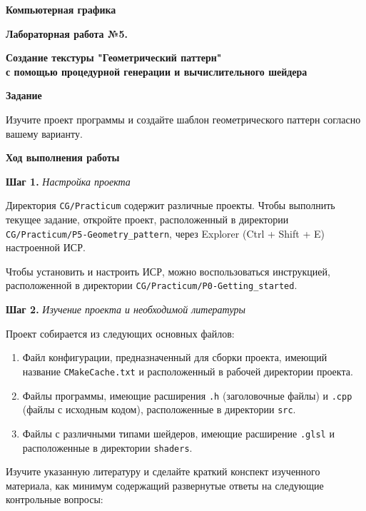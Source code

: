 \documentclass[a4paper,12pt]{article}
\begin{document}
\fontsize{14pt}{16pt}\selectfont
\begin{center}
    \textbf{{\Large Компьютерная графика}}
    
    \textbf{{\large Лабораторная работа №5. }}
    
    \textbf{{\large Создание текстуры "Геометрический паттерн" \\ с помощью процедурной генерации и вычислительного шейдера}}
    \end{center}
    
    \textbf{Задание}
    
    Изучите проект программы и создайте шаблон геометрического паттерн согласно вашему варианту.
    
    \textbf{Ход выполнения работы}
    
    \textbf{Шаг 1.} \textit{Настройка проекта}
    
    Директория \texttt{CG/Practicum} содержит различные проекты. Чтобы выполнить текущее задание, откройте проект, расположенный в директории \\
    \texttt{CG/Practicum/P5-Geometry\_pattern}, через Explorer (Ctrl + Shift + E) настроенной ИСР.
    
    Чтобы установить и настроить ИСР, можно воспользоваться инструкцией, расположенной в директории \texttt{CG/Practicum/P0-Getting\_started}.
    
    \textbf{Шаг 2.} \textit{Изучение проекта и необходимой литературы}
    
    Проект собирается из следующих основных файлов:
    
    \begin{enumerate}
        \item Файл конфигурации, предназначенный для сборки проекта, имеющий название \texttt{CMakeCache.txt} и расположенный в рабочей директории проекта.
        \item Файлы программы, имеющие расширения \texttt{.h} (заголовочные файлы) и \texttt{.cpp} (файлы с исходным кодом), расположенные в директории \texttt{src}.
        \item Файлы с различными типами шейдеров, имеющие расширение \texttt{.glsl} и расположенные в директории \texttt{shaders}.
    \end{enumerate}
    
    Изучите указанную литературу и сделайте краткий конспект изученного материала, как минимум содержащий развернутые ответы на следующие контрольные вопросы:
    
\end{document}
